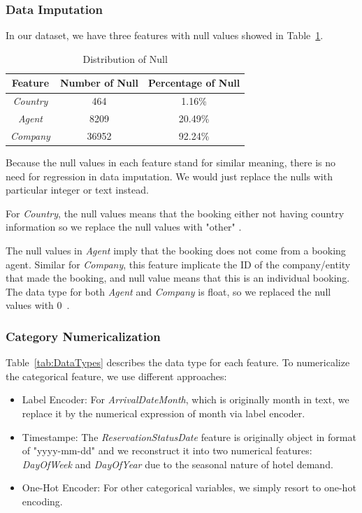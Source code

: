 \documentclass[10pt,twocolumn,letterpaper]{article}
\begin{document}
\subsubsection{Data Imputation}
In our dataset, we have three features with null values showed in Table~\ref{Tab:NullDist}.
\begin{table}[ht]
\begin{center}
\begin{tabular}{|c|c|c|} \hline
    Feature & Number of Null & Percentage of Null\\ \hline
    \emph{Country} & 464 & 1.16\% \\ 
    \emph{Agent} & 8209 & 20.49\% \\ 
    \emph{Company} & 36952 & 92.24\% \\ \hline
\end{tabular}
\end{center}
\caption{\label{Tab:NullDist} Distribution of Null}
\end{table}

Because the null values in each feature stand for similar meaning, there is no need for regression in data imputation. We would just replace the nulls with particular integer or text instead.

For \emph{Country}, the null values means that the booking either not having country information so we replace the null values with "other" .

The null values in \emph{Agent} imply that the booking does not come from a booking agent. Similar for \emph{Company}, this feature implicate the ID of the company/entity that made the booking, and null value means that this is an individual booking. The data type for both \emph{Agent} and \emph{Company} is float, so we replaced the null values with $0$~\cite{ANTONIO201941}.

\subsubsection{Category Numericalization}

Table~\ref{tab:DataTypes} describes the data type for each feature. To numericalize the categorical feature, we use different approaches:

\begin{itemize}
    \item Label Encoder: For \emph{ArrivalDateMonth}, which is originally month in text, we replace it by the numerical expression of month via label encoder. 
    \item Timestampe: The \emph{ReservationStatusDate} feature is originally object in format of "yyyy-mm-dd" and we reconstruct it into two numerical features: \emph{DayOfWeek} and \emph{DayOfYear} due to the seasonal nature of hotel demand.
    \item One-Hot Encoder: For other categorical variables, we simply resort to one-hot encoding.
\end{itemize}
\end{document}
